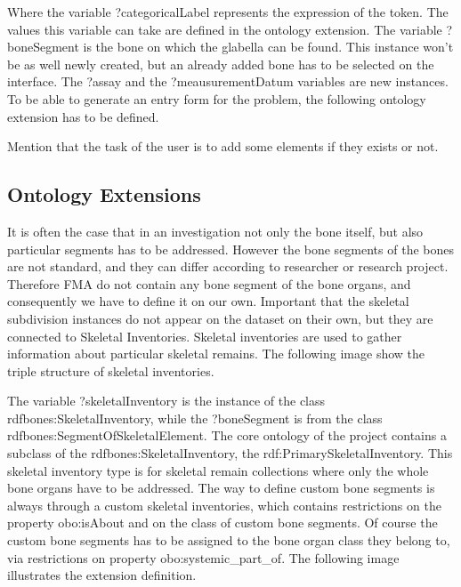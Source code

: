
Where the variable ?categoricalLabel represents the expression of the token. The values this variable can take are defined in the ontology extension. The variable ?boneSegment is the bone on which the glabella can be found. This instance won’t be as well newly created, but an already added bone has to be selected on the interface. The ?assay and the ?meausurementDatum variables are new instances.  To be able to generate an entry form for the problem, the following ontology extension has to be defined.



Mention that the task of the user is to add some elements if they exists or not.


\subsection{Ontology Extensions}

It is often the case that in an investigation not only the bone itself, but also particular segments has to be addressed. However the bone segments of the bones are not standard, and they can differ according to researcher or research project. Therefore FMA do not contain any bone segment of the bone organs, and consequently we have to define it on our own. 
Important that the skeletal subdivision instances do not appear on the dataset on their own, but they are connected to Skeletal Inventories. Skeletal inventories are used to gather information about particular skeletal remains.  The following image show the triple structure of skeletal inventories.


The variable ?skeletalInventory is the instance of the class rdfbones:SkeletalInventory, while the ?boneSegment is from the class rdfbones:SegmentOfSkeletalElement. The core ontology of the project contains a subclass of the rdfbones:SkeletalInventory, the rdf:PrimarySkeletalInventory. This skeletal inventory type is for skeletal remain collections where only the whole bone organs have to be addressed.  The way to define custom bone segments is always through a custom skeletal inventories, which contains restrictions on the property obo:isAbout and on the class of custom bone segments. Of course the custom bone segments has to be assigned to the bone organ class they belong to, via restrictions on property obo:systemic\_part\_of. The following image illustrates the extension definition.


